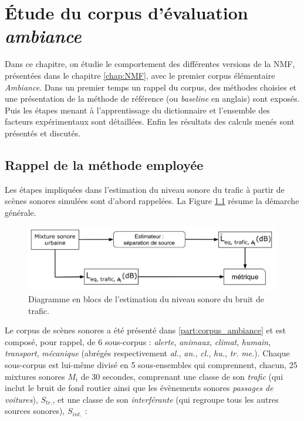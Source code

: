 
\chapter{\'Etude du corpus d'évaluation \textit{ambiance}}
\label{chap:ambiance}
Dans ce chapitre, on étudie le comportement des différentes versions de la NMF, présentées dans le chapitre \ref{chap:NMF},  avec le premier corpus élémentaire \textit{Ambiance}. 
Dans un premier temps un rappel du corpus, des méthodes choisies et une présentation de la méthode de référence (ou \textit{baseline} en anglais) sont exposés. Puis les étapes menant à l'apprentissage du dictionnaire et l'ensemble des facteurs expérimentaux sont détaillées. Enfin les résultats des calculs menés sont présentés et discutés.


\section{Rappel de la méthode employée}

Les étapes impliquées dans l'estimation du niveau sonore du trafic à partir de scènes sonores simulées sont d'abord rappelées. La Figure \ref{fig:rappel_estimateur} résume la démarche générale.

\begin{figure}[ht]
\centering
\includegraphics[width=.8\linewidth]{./figures/NMF/Bloc_diagram_estimateur_FR.pdf}
\caption{Diagramme en blocs de l'estimation du niveau sonore du bruit de trafic.}
\label{fig:rappel_estimateur}
\end{figure}

Le corpus de scènes sonores a été présenté dans \ref{part:corpus_ambiance} et est composé, pour rappel, de 6 sous-corpus : \textit{alerte}, \textit{animaux}, \textit{climat}, \textit{humain}, \textit{transport}, \textit{mécanique} (abrégés respectivement \textit{al.}, \textit{an.}, \textit{cl.}, \textit{hu.}, \textit{tr.} \textit{me.}). Chaque sous-corpus est lui-même divisé en 5 sous-ensembles qui comprennent, chacun, 25 mixtures sonores $M_i$ de 30 secondes, comprenant une classe de son \textit{trafic} (qui inclut le bruit de fond routier ainsi que les évènements sonores \textit{passages de voitures}), $S_{tr.}$, et une classe de son \textit{interférante} (qui regroupe tous les autres sources sonores), $S_{int.}$ : 

